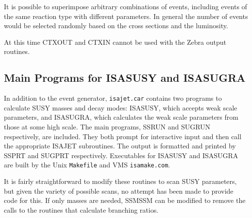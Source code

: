It is possible to superimpose arbitrary combinations of events,
including events of the same reaction type with different parameters.
In general the number of events would be selected randomly based on the
cross sections and the luminosity.

      At this time CTXOUT and CTXIN cannot be used with the Zebra
output routines.

\subsection{Main Programs for ISASUSY and ISASUGRA\label{sugrun}}

     In addition to the event generator, \verb|isajet.car| contains two
programs to calculate SUSY masses and decay modes: ISASUSY, which
accepts weak scale parameters, and ISASUGRA, which calculates the weak
scale parameters from those at some high scale. The main programs, SSRUN
and SUGRUN respectively, are included. They both prompt for interactive
input and then call the appropriate ISAJET subroutines. The output is
formatted and printed by SSPRT and SUGPRT respectively. Executables for
ISASUSY and ISASUGRA are built by the Unix \verb|Makefile| and VMS
\verb|isamake.com|. 

     It is fairly straightforward to modify these routines to scan SUSY
parameters, but given the variety of possible scans, no attempt has been
made to provide code for this. If only masses are needed, SSMSSM can be
modified to remove the calls to the routines that calculate branching
ratios.
